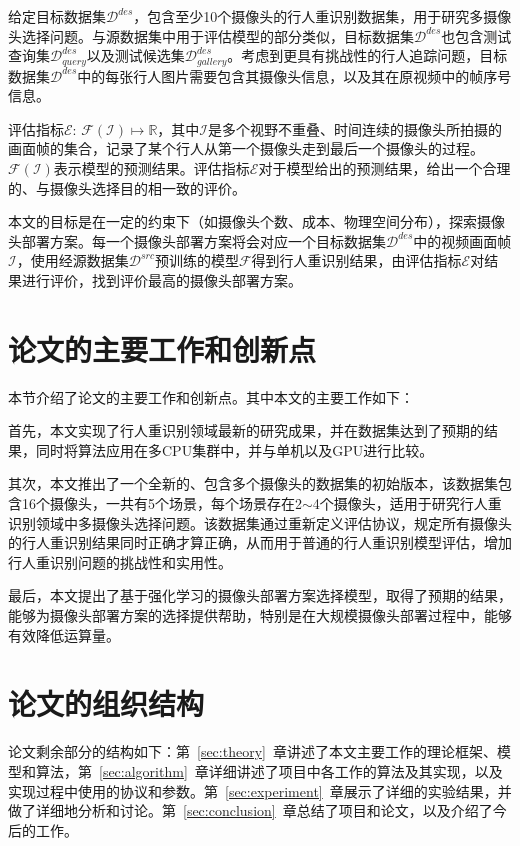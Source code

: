 给定目标数据集$\mathcal{D}^{des}$，包含至少10个摄像头的行人重识别数据集，用于研究多摄像头选择问题。与源数据集中用于评估模型的部分类似，目标数据集$\mathcal{D}^{des}$也包含测试查询集$\mathcal{D}_{query}^{des}$以及测试候选集$\mathcal{D}_{gallery}^{des}$。考虑到更具有挑战性的行人追踪问题，目标数据集$\mathcal{D}^{des}$中的每张行人图片需要包含其摄像头信息，以及其在原视频中的帧序号信息。

评估指标$\mathcal{E}:\,\mathcal{F}(\mathcal{I})\mapsto\mathbb{R}$，其中$\mathcal{I}$是多个视野不重叠、时间连续的摄像头所拍摄的画面帧的集合，记录了某个行人从第一个摄像头走到最后一个摄像头的过程。$\mathcal{F}(\mathcal{I})$表示模型的预测结果。评估指标$\mathcal{E}$对于模型给出的预测结果，给出一个合理的、与摄像头选择目的相一致的评价。

本文的目标是在一定的约束下（如摄像头个数、成本、物理空间分布），探索摄像头部署方案。每一个摄像头部署方案将会对应一个目标数据集$\mathcal{D}^{des}$中的视频画面帧$\mathcal{I}$，使用经源数据集$\mathcal{D}^{src}$预训练的模型$\mathcal{F}$得到行人重识别结果，由评估指标$\mathcal{E}$对结果进行评价，找到评价最高的摄像头部署方案。

\section{论文的主要工作和创新点}

本节介绍了论文的主要工作和创新点。其中本文的主要工作如下：

首先，本文实现了行人重识别领域最新的研究成果\cite{sun2017beyond}，并在数据集\cite{zheng2015scalable}达到了预期的结果，同时将算法应用在多CPU集群中，并与单机以及GPU进行比较。

其次，本文推出了一个全新的、包含多个摄像头的数据集的初始版本，该数据集包含16个摄像头，一共有5个场景，每个场景存在2$\sim$4个摄像头，适用于研究行人重识别领域中多摄像头选择问题。该数据集通过重新定义评估协议，规定所有摄像头的行人重识别结果同时正确才算正确，从而用于普通的行人重识别模型评估，增加行人重识别问题的挑战性和实用性。

最后，本文提出了基于强化学习的摄像头部署方案选择模型，取得了预期的结果，能够为摄像头部署方案的选择提供帮助，特别是在大规模摄像头部署过程中，能够有效降低运算量。

\section{论文的组织结构}

论文剩余部分的结构如下：第~\ref{sec:theory}~章讲述了本文主要工作的理论框架、模型和算法，第~\ref{sec:algorithm}~章详细讲述了项目中各工作的算法及其实现，以及实现过程中使用的协议和参数。第~\ref{sec:experiment}~章展示了详细的实验结果，并做了详细地分析和讨论。第~\ref{sec:conclusion}~章总结了项目和论文，以及介绍了今后的工作。